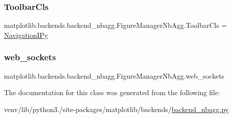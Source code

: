 \subsubsection{\texorpdfstring{Toolbar\+Cls}{ToolbarCls}}
{\footnotesize\ttfamily matplotlib.\+backends.\+backend\+\_\+nbagg.\+Figure\+Manager\+Nb\+Agg.\+Toolbar\+Cls = \hyperlink{classmatplotlib_1_1backends_1_1backend__nbagg_1_1NavigationIPy}{Navigation\+I\+Py}\hspace{0.3cm}{\ttfamily [static]}}

\mbox{\label{classmatplotlib_1_1backends_1_1backend__nbagg_1_1FigureManagerNbAgg_a4c7884c5bd3a19d092a7931c55a4febf}} 
\subsubsection{\texorpdfstring{web\+\_\+sockets}{web\_sockets}}
{\footnotesize\ttfamily matplotlib.\+backends.\+backend\+\_\+nbagg.\+Figure\+Manager\+Nb\+Agg.\+web\+\_\+sockets}



The documentation for this class was generated from the following file\+:\begin{DoxyCompactItemize}
\item 
venv/lib/python3./site-\/packages/matplotlib/backends/\hyperlink{backend__nbagg_8py}{backend\+\_\+nbagg.\+py}\end{DoxyCompactItemize}
